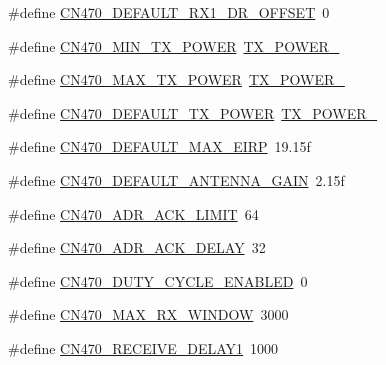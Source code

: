 \begin{DoxyCompactItemize}
\item 
\#define \mbox{\hyperlink{group___r_e_g_i_o_n_c_n470_gac88e0c39828cba950425f0fbee5d6b59}{C\+N470\+\_\+\+D\+E\+F\+A\+U\+L\+T\+\_\+\+R\+X1\+\_\+\+D\+R\+\_\+\+O\+F\+F\+S\+ET}}~0
\item 
\#define \mbox{\hyperlink{group___r_e_g_i_o_n_c_n470_ga706088a08c37b56b67e88d8afa9a1db8}{C\+N470\+\_\+\+M\+I\+N\+\_\+\+T\+X\+\_\+\+P\+O\+W\+ER}}~\mbox{\hyperlink{group___r_e_g_i_o_n_ga3c7bd9a98f0c1e7e9aaa90857c4bd700}{T\+X\+\_\+\+P\+O\+W\+E\+R\+\_}}
\item 
\#define \mbox{\hyperlink{group___r_e_g_i_o_n_c_n470_gae977eb62cc9b2f49770b5f0d5ec1e5df}{C\+N470\+\_\+\+M\+A\+X\+\_\+\+T\+X\+\_\+\+P\+O\+W\+ER}}~\mbox{\hyperlink{group___r_e_g_i_o_n_gab33618449f2a573142c463ab071ef8ed}{T\+X\+\_\+\+P\+O\+W\+E\+R\+\_}}
\item 
\#define \mbox{\hyperlink{group___r_e_g_i_o_n_c_n470_ga0edc38df28f50fc6979f33f954a934a0}{C\+N470\+\_\+\+D\+E\+F\+A\+U\+L\+T\+\_\+\+T\+X\+\_\+\+P\+O\+W\+ER}}~\mbox{\hyperlink{group___r_e_g_i_o_n_gab33618449f2a573142c463ab071ef8ed}{T\+X\+\_\+\+P\+O\+W\+E\+R\+\_}}
\item 
\#define \mbox{\hyperlink{group___r_e_g_i_o_n_c_n470_ga1b95710cffe97a036ec3a40b9c6c2dd6}{C\+N470\+\_\+\+D\+E\+F\+A\+U\+L\+T\+\_\+\+M\+A\+X\+\_\+\+E\+I\+RP}}~19.\+15f
\item 
\#define \mbox{\hyperlink{group___r_e_g_i_o_n_c_n470_ga913d250bd6010ad63f70603ced599b87}{C\+N470\+\_\+\+D\+E\+F\+A\+U\+L\+T\+\_\+\+A\+N\+T\+E\+N\+N\+A\+\_\+\+G\+A\+IN}}~2.\+15f
\item 
\#define \mbox{\hyperlink{group___r_e_g_i_o_n_c_n470_gab622e938b7f31be68bbab0569252cc16}{C\+N470\+\_\+\+A\+D\+R\+\_\+\+A\+C\+K\+\_\+\+L\+I\+M\+IT}}~64
\item 
\#define \mbox{\hyperlink{group___r_e_g_i_o_n_c_n470_ga36e45d676fbedb022706448bfb3ae1ed}{C\+N470\+\_\+\+A\+D\+R\+\_\+\+A\+C\+K\+\_\+\+D\+E\+L\+AY}}~32
\item 
\#define \mbox{\hyperlink{group___r_e_g_i_o_n_c_n470_ga02ff150057a51ba9fd56e9082a96bf0d}{C\+N470\+\_\+\+D\+U\+T\+Y\+\_\+\+C\+Y\+C\+L\+E\+\_\+\+E\+N\+A\+B\+L\+ED}}~0
\item 
\#define \mbox{\hyperlink{group___r_e_g_i_o_n_c_n470_ga9969677259320df9c736239b84d880ff}{C\+N470\+\_\+\+M\+A\+X\+\_\+\+R\+X\+\_\+\+W\+I\+N\+D\+OW}}~3000
\item 
\#define \mbox{\hyperlink{group___r_e_g_i_o_n_c_n470_gac402464278f79670ea353ee209878217}{C\+N470\+\_\+\+R\+E\+C\+E\+I\+V\+E\+\_\+\+D\+E\+L\+A\+Y1}}~1000
\item 

\end{DoxyCompactItemize}

